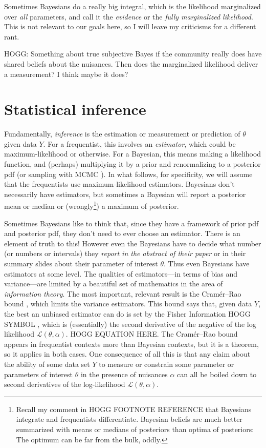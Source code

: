\documentclass{article}
\begin{document}
Sometimes Bayesians do a really big integral, which is the likelihood marginalized over \emph{all} parameters,
and call it the \emph{evidence} or the \emph{fully marginalized likelihood}.
This is not relevant to our goals here, so I will leave my criticisms for a different rant.

HOGG: Something about true subjective Bayes if the community really does have shared beliefs about the nuisances. Then does the marginalized likelihood deliver a measurement? I think maybe it does?

\section{Statistical inference}\label{sec:inference}
Fundamentally, \emph{inference} is the estimation or measurement or prediction of $\theta$ given data $Y$.
For a frequentist, this involves an \emph{estimator}, which could be maximum-likelihood or otherwise.
For a Bayesian, this means making a likelihood function, and (perhaps) multiplying it by a prior and renormalizing to a posterior pdf (or sampling with MCMC \cite{mcmc}).
In what follows, for specificity, we will assume that the frequentists use maximum-likelihood estimators.
Bayesians don't necessarily have estimators, but sometimes a Bayesian will report a posterior mean or median or (wrongly\footnote{%
Recall my comment in HOGG FOOTNOTE REFERENCE that Bayesians integrate and frequentists differentiate. Bayesian beliefs are much better summarized with means or medians of posteriors than optima of posteriors: The optimum can be far from the bulk, oddly.})
a maximum of posterior.

Sometimes Bayesians like to think that, since they have a framework of prior pdf and posterior pdf, they don't need to ever choose an estimator.
There is an element of truth to this!
However even the Bayesians have to decide what number (or numbers or intervals) they \emph{report in the abstract of their paper} or in their summary slides about their parameter of interest $\theta$.
Thus even Bayesians have estimators at some level.
The qualities of estimators---in terms of bias and variance---are limited by a beautiful set of mathematics in the area of \emph{information theory}.
The most important, relevant result is the Cram\'er--Rao bound \cite{cramer, rao}, which limits the variance estimators.
This bound says that, given data $Y$, the best an unbiased estimator can do is set by the Fisher Information HOGG SYMBOL \cite{fisher},
which is (essentially) the second derivative of the negative of the log likelihood $\mathscr{L}(\theta,\alpha)$.
HOGG EQUATION HERE.
The Cram\'er--Rao bound appears in frequentist contexts more than Bayesian contexts, but it is a theorem, so it applies in both cases.
One consequence of all this is that any claim about the ability of some data set $Y$ to measure or constrain some parameter or parameters of interest $\theta$ in the presence of nuisances $\alpha$ can all be boiled down to second derivatives of the log-likelihood $\mathscr{L}(\theta,\alpha)$.
\end{document}
